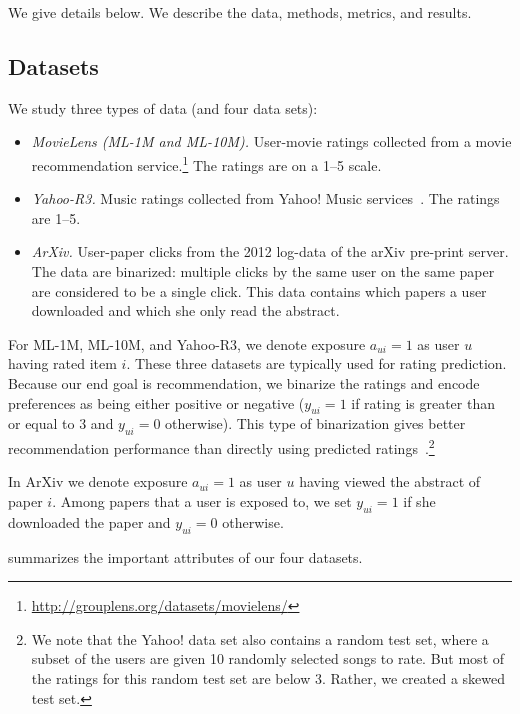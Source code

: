 We give details below. We describe the data, methods, metrics, and
results.

\subsection{Datasets} \label{sec:data}

We study three types of data (and four data sets):
\begin{itemize}
\item \textit{MovieLens (ML-1M and ML-10M).} User-movie ratings
  collected from a movie recommendation
  service.\footnote{\url{http://grouplens.org/datasets/movielens/}}
  The ratings are on a 1--5 scale.

\item \textit{Yahoo-R3.} Music ratings collected from Yahoo!
  Music services~\citep{Marlin09NMAR}. The ratings are 1--5.

\item \textit{ArXiv.} User-paper clicks from the 2012 log-data of the
  arXiv pre-print server. The data are binarized: multiple clicks by
  the same user on the same paper are considered to be a single click.
  This data contains which papers a user
  downloaded and which she only read the abstract.
\end{itemize}

For ML-1M, ML-10M, and Yahoo-R3, we denote exposure $a_{ui} = 1$ as
user $u$ having rated item $i$. These three datasets are typically
used for rating prediction. Because our end goal is recommendation, we
binarize the ratings and encode preferences as being either positive
or negative ($y_{ui} = 1$ if rating is greater than or equal to 3 and
$y_{ui} = 0$ otherwise). This type of binarization gives better
recommendation performance than directly using predicted
ratings~\citep{hu2008collaborative}.\footnote{We note that
  the Yahoo! data set also contains a random test set, where a subset
  of the users are given 10 randomly selected songs to rate. But most
  of the ratings for this random test set are below 3. Rather,
  we created a skewed test set.}

In ArXiv we denote exposure $a_{ui} = 1$ as user $u$ having viewed the
abstract of paper $i$. Among papers that a user is exposed to, we set
$y_{ui} = 1$ if she downloaded the paper and $y_{ui} = 0$
otherwise.

 summarizes the important attributes of our four datasets.

